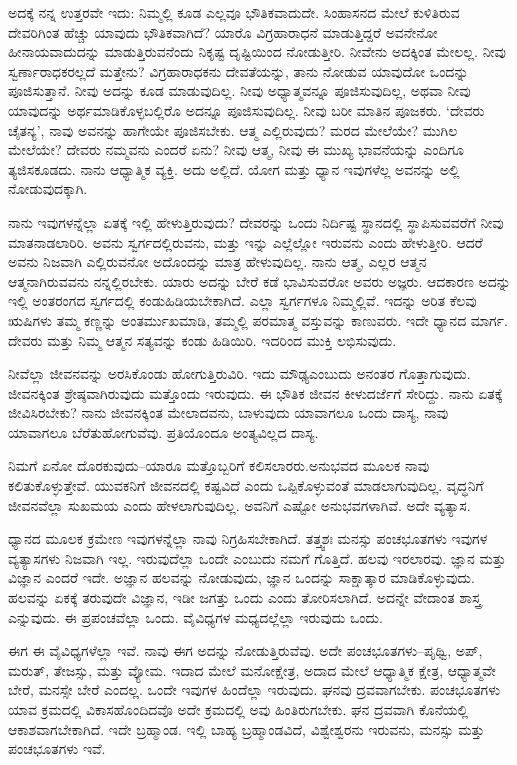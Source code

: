 ಅದಕ್ಕೆ ನನ್ನ ಉತ್ತರವೇ ಇದು: ನಿಮ್ಮಲ್ಲಿ ಕೂಡ ಎಲ್ಲವೂ ಭೌತಿಕವಾದುದೇ. ಸಿಂಹಾಸನದ ಮೇಲೆ ಕುಳಿತಿರುವ ದೇವರಿಗಿಂತ ಹೆಚ್ಚು ಯಾವುದು ಭೌತಿಕವಾಗಿದೆ? ಯಾರೊ ವಿಗ್ರಹಾರಾಧನೆ ಮಾಡುತ್ತಿದ್ದರೆ ಅವನೇನೋ ಹೀನಾಯವಾದುದನ್ನು ಮಾಡುತ್ತಿರುವನೆಂದು ನಿಕೃಷ್ಟ ದೃಷ್ಟಿಯಿಂದ ನೋಡುತ್ತೀರಿ. ನೀವೇನು ಅದಕ್ಕಿಂತ ಮೇಲಲ್ಲ. ನೀವು ಸ್ವರ್ಣಾರಾಧಕರಲ್ಲದೆ ಮತ್ತೇನು? ವಿಗ್ರಹಾರಾಧಕನು ದೇವತೆಯನ್ನು, ತಾನು ನೋಡುವ ಯಾವುದೋ ಒಂದನ್ನು ಪೂಜಿಸುತ್ತಾನೆ. ನೀವು ಅದನ್ನು ಕೂಡ ಮಾಡುವುದಿಲ್ಲ. ನೀವು ಅಧ್ಯಾತ್ಮವನ್ನೂ ಪೂಜಿಸುವುದಿಲ್ಲ, ಅಥವಾ ನೀವು ಯಾವುದನ್ನು ಅರ್ಥಮಾಡಿಕೊಳ್ಳಬಲ್ಲಿರೊ ಅದನ್ನೂ ಪೂಜಿಸುವುದಿಲ್ಲ. ನೀವು ಬರೀ ಮಾತಿನ ಪೂಜಕರು. `ದೇವರು ಚೈತನ್ಯ', ನಾವು ಅವನನ್ನು ಹಾಗೇಯೇ ಪೂಜಿಸಬೇಕು. ಆತ್ಮ ಎಲ್ಲಿರುವುದು? ಮರದ ಮೇಲೆಯೇ? ಮುಗಿಲ ಮೇಲೆಯೇ? ದೇವರು ನಮ್ಮವನು ಎಂದರೆ ಏನು? ನೀವು ಆತ್ಮ, ನೀವು ಈ ಮುಖ್ಯ ಭಾವನೆಯನ್ನು ಎಂದಿಗೂ ತ್ಯಜಿಸಕೂಡದು. ನಾನು ಆಧ್ಯಾತ್ಮಿಕ ವ್ಯಕ್ತಿ. ಅದು ಅಲ್ಲಿದೆ. ಯೋಗ ಮತ್ತು ಧ್ಯಾನ ಇವುಗಳೆಲ್ಲ ಅವನನ್ನು ಅಲ್ಲಿ ನೋಡುವುದಕ್ಕಾಗಿ.

ನಾನು ಇವುಗಳನ್ನೆಲ್ಲಾ ಏತಕ್ಕೆ ಇಲ್ಲಿ ಹೇಳುತ್ತಿರುವುದು? ದೇವರನ್ನು ಒಂದು ನಿರ್ದಿಷ್ಟ ಸ್ಥಾನದಲ್ಲಿ ಸ್ಥಾಪಿಸುವವರೆಗೆ ನೀವು ಮಾತನಾಡಲಾರಿರಿ. ಅವನು ಸ್ವರ್ಗದಲ್ಲಿರುವನು, ಮತ್ತು ಇನ್ನು ಎಲ್ಲೆಲ್ಲೋ ಇರುವನು ಎಂದು ಹೇಳುತ್ತೀರಿ. ಆದರೆ ಅವನು ನಿಜವಾಗಿ ಎಲ್ಲಿರುವನೋ ಅದೊಂದನ್ನು ಮಾತ್ರ ಹೇಳುವುದಿಲ್ಲ. ನಾನು ಆತ್ಮ, ಎಲ್ಲರ ಆತ್ಮನ ಆತ್ಮನಾಗಿರುವವನು ನನ್ನಲ್ಲಿರಬೇಕು. ಯಾರು ಅದನ್ನು ಬೇರೆ ಕಡೆ ಭಾವಿಸುವರೋ ಅವರು ಅಜ್ಞರು. ಆದಕಾರಣ ಅದನ್ನು ಇಲ್ಲಿ ಅಂತರಂಗದ ಸ್ವರ್ಗದಲ್ಲಿ ಕಂಡುಹಿಡಿಯಬೇಕಾಗಿದೆ. ಎಲ್ಲಾ ಸ್ವರ್ಗಗಳೂ ನಿಮ್ಮಲ್ಲಿವೆ. ಇದನ್ನು ಅರಿತ ಕೆಲವು ಋಷಿಗಳು ತಮ್ಮ ಕಣ್ಣನ್ನು ಅಂತರ್ಮುಖಮಾಡಿ, ತಮ್ಮಲ್ಲಿ ಪರಮಾತ್ಮ ವಸ್ತುವನ್ನು ಕಾಣುವರು. ಇದೇ ಧ್ಯಾನದ ಮಾರ್ಗ. ದೇವರು ಮತ್ತು ನಿಮ್ಮ ಆತ್ಮನ ಸತ್ಯವನ್ನು ಕಂಡು ಹಿಡಿಯಿರಿ. ಇದರಿಂದ ಮುಕ್ತಿ ಲಭಿಸುವುದು.

ನೀವೆಲ್ಲಾ ಜೀವನವನ್ನು ಅರಸಿಕೊಂಡು ಹೋಗುತ್ತಿರುವಿರಿ. ಇದು ಮೌಢ್ಯ\break ಎಂಬುದು ಅನಂತರ ಗೊತ್ತಾಗುವುದು. ಜೀವನಕ್ಕಿಂತ ಶ್ರೇಷ್ಠವಾಗಿರುವುದು ಮತ್ತೊಂದು ಇರುವುದು. ಈ ಭೌತಿಕ ಜೀವನ ಕೀಳುದರ್ಜೆಗೆ ಸೇರಿದ್ದು. ನಾನು ಏತಕ್ಕೆ ಜೀವಿಸಿರಬೇಕು? ನಾನು ಜೀವನಕ್ಕಿಂತ ಮೇಲಾದವನು, ಬಾಳುವುದು ಯಾವಾಗಲೂ ಒಂದು ದಾಸ್ಯ, ನಾವು ಯಾವಾಗಲೂ ಬೆರೆತುಹೋಗುವೆವು. ಪ್ರತಿಯೊಂದೂ ಅಂತ್ಯವಿಲ್ಲದ ದಾಸ್ಯ.

ನಿಮಗೆ ಏನೋ ದೊರಕುವುದು–ಯಾರೂ ಮತ್ತೊಬ್ಬರಿಗೆ ಕಲಿಸಲಾರರು.\break ಅನುಭವದ ಮೂಲಕ ನಾವು ಕಲಿತುಕೊಳ್ಳುತ್ತೇವೆ. ಯುವಕನಿಗೆ ಜೀವನದಲ್ಲಿ ಕಷ್ಟವಿದೆ ಎಂದು ಒಪ್ಪಿಕೊಳ್ಳುವಂತೆ ಮಾಡಲಾಗುವುದಿಲ್ಲ. ವೃದ್ಧನಿಗೆ ಜೀವನವೆಲ್ಲಾ ಸುಖಮಯ ಎಂದು ಹೇಳಲಾಗುವುದಿಲ್ಲ. ಅವನಿಗೆ ಎಷ್ಟೋ ಅನುಭವಗಳಾಗಿವೆ. ಅದೇ ವ್ಯತ್ಯಾಸ.

ಧ್ಯಾನದ ಮೂಲಕ ಕ್ರಮೇಣ ಇವುಗಳನ್ನೆಲ್ಲಾ ನಾವು ನಿಗ್ರಹಿಸಬೇಕಾಗಿದೆ. ತತ್ತ್ವಶಃ ಮನಸ್ಸು ಪಂಚಭೂತಗಳು ಇವುಗಳ ವ್ಯತ್ಯಾಸಗಳು ನಿಜವಾಗಿ ಇಲ್ಲ. ಇರುವುದೆಲ್ಲಾ ಒಂದೇ ಎಂಬುದು ನಮಗೆ ಗೊತ್ತಿದೆ. ಹಲವು ಇರಲಾರವು. ಜ್ಞಾನ ಮತ್ತು ವಿಜ್ಞಾನ ಎಂದರೆ ಇದೇ. ಅಜ್ಞಾನ ಹಲವನ್ನು ನೋಡುವುದು, ಜ್ಞಾನ ಒಂದನ್ನು ಸಾಕ್ಷಾತ್ಕಾರ ಮಾಡಿಕೊಳ್ಳುವುದು. ಹಲವನ್ನು ಏಕಕ್ಕೆ ತರುವುದೇ ವಿಜ್ಞಾನ, ಇಡೀ ಜಗತ್ತು ಒಂದು ಎಂದು ತೋರಿಸಲಾಗಿದೆ. ಅದನ್ನೇ ವೇದಾಂತ ಶಾಸ್ತ್ರ ಎನ್ನುವುದು. ಈ ಪ್ರಪಂಚವೆಲ್ಲಾ ಒಂದು. ವೈವಿಧ್ಯಗಳ ಮಧ್ಯದಲ್ಲೆಲ್ಲಾ ಇರುವುದು ಒಂದು.

ಈಗ ಈ ವೈವಿಧ್ಯಗಳೆಲ್ಲಾ ಇವೆ. ನಾವು ಈಗ ಅದನ್ನು ನೋಡುತ್ತಿರುವೆವು. ಅದೇ ಪಂಚಭೂತಗಳು–ಪೃಥ್ವಿ, ಅಪ್, ಮರುತ್, ತೇಜಸ್ಸು, ಮತ್ತು ವ್ಯೋಮ. ಇದಾದ ಮೇಲೆ ಮನೋಕ್ಷೇತ್ರ, ಅದಾದ ಮೇಲೆ ಆಧ್ಯಾತ್ಮಿಕ ಕ್ಷೇತ್ರ, ಆಧ್ಯಾತ್ಮವೇ ಬೇರೆ, ಮನಸ್ಸೇ ಬೇರೆ ಎಂದಲ್ಲ. ಒಂದೇ ಇವುಗಳ ಹಿಂದೆಲ್ಲಾ ಇರುವುದು. ಘನವು ದ್ರವವಾಗಬೇಕು. ಪಂಚಭೂತಗಳು ಯಾವ ಕ್ರಮದಲ್ಲಿ ವಿಕಾಸಹೊಂದಿದವೊ ಅದೇ ಕ್ರಮದಲ್ಲಿ ಅವು ಹಿಂತಿರುಗಬೇಕು. ಘನ ದ್ರವವಾಗಿ ಕೊನೆಯಲ್ಲಿ ಆಕಾಶವಾಗಬೇಕಾಗಿದೆ. ಇದೇ ಬ್ರಹ್ಮಾಂಡ. ಇಲ್ಲಿ ಬಾಹ್ಯ ಬ್ರಹ್ಮಾಂಡವಿದೆ, ವಿಶ್ವೇಶ್ವರನು ಇರುವನು, ಮನಸ್ಸು ಮತ್ತು ಪಂಚಭೂತಗಳು ಇವೆ.

